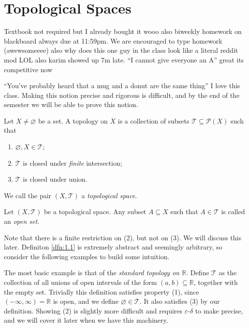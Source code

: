 \chapter{Topological Spaces}
Textbook not required but I already bought it wooo also biweekly homework on blackboard always due at 11:59pm. We are encouraged to type homework (awewsomeeee) also why does this one guy in the class look like a literal reddit mod LOL also karim showed up 7m late. ``I cannot give everyone an A'' great its competitive now

``You've probably heard that a mug and a donut are the same thing'' I love this class. Making this notion precise and rigorous is difficult, and by the end of the semester we will be able to prove this notion.

\begin{definition}\label{dfn:1.1}
	Let $X\neq \varnothing$ be a set. A topology on $X$ is a collection of subsets $\mathcal{T} \subseteq \mathscr{P} (X)$ such that
	\begin{enumerate}
		\item $\varnothing,X\in \mathcal{T} $;
		\item $\mathcal{T} $ is closed under \emph{finite} intersection;
		\item $\mathcal{T} $ is closed under union.
	\end{enumerate}
	We call the pair $(X,\mathcal{T} )$ a \emph{topological space}.
\end{definition}
\begin{definition}\label{dfn:1.2}
	Let $(X,\mathcal{T} )$ be a topological space. Any subset $A\subseteq X$ such that $A\in \mathcal{T} $ is called an \emph{open set}.
\end{definition}

Note that there is a finite restriction on (2), but not on (3). We will discuss this later. Definiton \ref{dfn:1.1} is extremely abstract and seemingly arbitrary, so consider the following examples to build some intuition.

The most basic example is that of the \emph{standard topology on $\mathbb{R}$}. Define $\mathcal{T} $ as the collection of all unions of open intervals of the form $(a,b)\subseteq \mathbb{R}$, together with the empty set. Trivially this definition satisfies property (1), since $(-\infty,\infty)=\mathbb{R}$ is open, and we define $\varnothing\in \mathcal{T} $. It also satisfies (3) by our definition. Showing (2) is slightly more difficult and requires $\varepsilon $-$\delta $ to make precise, and we will cover it later when we have this machinery.

